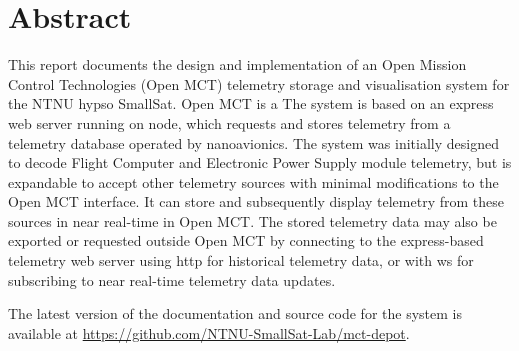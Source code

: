 \begin{comment}

\end{comment}

\section{Abstract}

This report documents the design and implementation of an Open Mission Control Technologies (Open MCT) \gls{telemetry} storage and visualisation system for the NTNU \acrshort{hypso} SmallSat. Open MCT is a  The system is based on an \Gls{express} web server running on \Gls{node}, which requests and stores telemetry from a telemetry database operated by \Gls{nanoavionics}. The system was initially designed to decode Flight Computer and Electronic Power Supply module telemetry, but is expandable to accept other telemetry sources with minimal modifications to the Open MCT interface. It can store and subsequently display telemetry from these sources in near real-time in Open MCT. The stored telemetry data may also be exported or requested outside Open MCT by connecting to the \Gls{express}-based telemetry web server using \acrshort{http} for historical telemetry data, or with \Gls{ws} for subscribing to near real-time telemetry data updates.

The latest version of the documentation and source code for the system is available at \url{https://github.com/NTNU-SmallSat-Lab/mct-depot}.

\clearpage